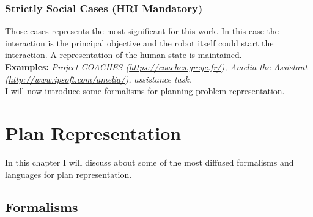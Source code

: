 \documentclass[pdftex,12pt,a4paper]{report}
\begin{document}
\subsection{Strictly Social Cases (HRI Mandatory)}
Those cases represents the most significant for this work. In this case the interaction is the principal objective and the robot itself could start the interaction. A representation of the human state is maintained.\\
\textbf{Examples:} \textit{Project COACHES (\url{https://coaches.greyc.fr/}), Amelia the Assistant (\url{http://www.ipsoft.com/amelia/}), assistance task}.\\

\noindent I will now introduce some formalisms for planning problem representation.\\ 


\chapter{Plan Representation}\label{sec:plan_repr}
In this chapter I will discuss about some of the most diffused formalisms and languages for plan representation.
\section{Formalisms}\label{sec:formalism}
\end{document}
